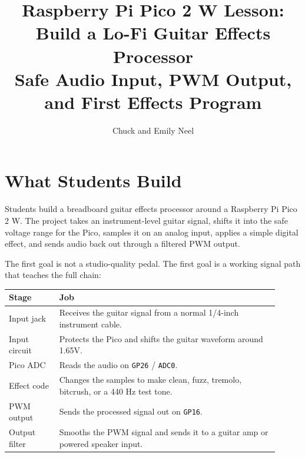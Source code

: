 \documentclass[11pt,letterpaper]{article}
\title{Raspberry Pi Pico 2 W Lesson: Build a Lo-Fi Guitar Effects Processor\\\large Safe Audio Input, PWM Output, and First Effects Program}
\author{Chuck and Emily Neel}
\date{}
\newcommand{\pin}[1]{\texttt{#1}}
\begin{document}
\maketitle
\vspace{-1.0em}
\small

\section*{What Students Build}
Students build a breadboard guitar effects processor around a Raspberry Pi Pico 2 W. The project takes an instrument-level guitar signal, shifts it into the safe voltage range for the Pico, samples it on an analog input, applies a simple digital effect, and sends audio back out through a filtered PWM output.

The first goal is not a studio-quality pedal. The first goal is a working signal path that teaches the full chain:

\begin{center}
\begin{tabular}{>{\raggedright\arraybackslash}p{0.17\linewidth} >{\raggedright\arraybackslash}p{0.74\linewidth}}
\toprule
Stage & Job \\
\midrule
Input jack & Receives the guitar signal from a normal 1/4-inch instrument cable. \\
Input circuit & Protects the Pico and shifts the guitar waveform around 1.65V. \\
Pico ADC & Reads the audio on \pin{GP26} / \pin{ADC0}. \\
Effect code & Changes the samples to make clean, fuzz, tremolo, bitcrush, or a 440 Hz test tone. \\
PWM output & Sends the processed signal out on \pin{GP16}. \\
Output filter & Smooths the PWM signal and sends it to a guitar amp or powered speaker input. \\
\bottomrule
\end{tabular}
\end{center}
\end{document}

